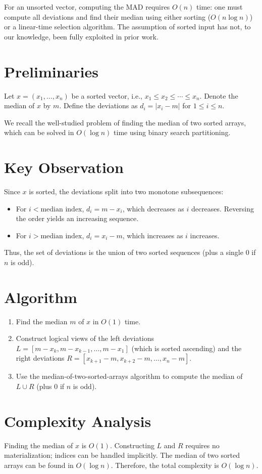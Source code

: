 \documentclass[11pt]{article}
\begin{document}
For an unsorted vector, computing the MAD requires $O(n)$ time: one must compute all deviations and find their median using either sorting ($O(n \log n)$) or a linear-time selection algorithm. The assumption of sorted input has not, to our knowledge, been fully exploited in prior work.

\section{Preliminaries}
Let $x = (x_1, \dots, x_n)$ be a sorted vector, i.e., $x_1 \leq x_2 \leq \cdots \leq x_n$. Denote the median of $x$ by $m$. Define the deviations as $d_i = |x_i - m|$ for $1 \leq i \leq n$.

We recall the well-studied problem of finding the median of two sorted arrays, which can be solved in $O(\log n)$ time using binary search partitioning.

\section{Key Observation}
Since $x$ is sorted, the deviations split into two monotone subsequences:
\begin{itemize}
    \item For $i < \text{median index}$, $d_i = m - x_i$, which decreases as $i$ decreases. Reversing the order yields an increasing sequence.
    \item For $i > \text{median index}$, $d_i = x_i - m$, which increases as $i$ increases.
\end{itemize}
Thus, the set of deviations is the union of two sorted sequences (plus a single $0$ if $n$ is odd).

\section{Algorithm}
\begin{enumerate}
    \item Find the median $m$ of $x$ in $O(1)$ time.
    \item Construct logical views of the left deviations $L = [m - x_{k}, m - x_{k-1}, \dots, m - x_1]$ (which is sorted ascending) and the right deviations $R = [x_{k+1} - m, x_{k+2} - m, \dots, x_n - m]$.
    \item Use the median-of-two-sorted-arrays algorithm to compute the median of $L \cup R$ (plus $0$ if $n$ is odd).
\end{enumerate}

\section{Complexity Analysis}
Finding the median of $x$ is $O(1)$. Constructing $L$ and $R$ requires no materialization; indices can be handled implicitly. The median of two sorted arrays can be found in $O(\log n)$. Therefore, the total complexity is $O(\log n)$.
\end{document}
